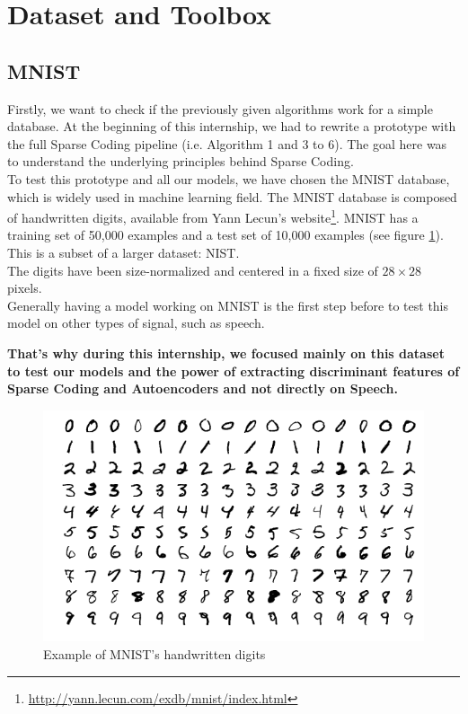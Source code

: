 \section{Dataset and Toolbox}
\subsection{MNIST}
Firstly, we want to check if the previously given algorithms work for a simple database. At the beginning of this internship, we had to rewrite a prototype with the full Sparse Coding pipeline (i.e. Algorithm 1 and 3 to 6). The goal here was to understand the underlying principles behind Sparse Coding.\\
To test this prototype and all our models, we have chosen the MNIST database, which is widely used in machine learning field. The MNIST database is composed of handwritten digits, available from Yann Lecun's website\footnote{\url{http://yann.lecun.com/exdb/mnist/index.html}}. MNIST has a training set of 50,000 examples and a test set of 10,000 examples (see figure \ref{fig:MNIST}). This is a subset of a larger dataset: NIST. \\
The digits have been size-normalized and centered in a fixed size of $28 \times 28$ pixels.\\
Generally having a model working on MNIST  is the first step before to test this model on other types of signal, such as speech.\\ 
\begin{mdframed}
\begin{center}
\textbf{That's why during this internship, we focused mainly on this dataset to test our models and the power of extracting discriminant features of Sparse Coding and Autoencoders and not directly on Speech.} 
\end{center}
\end{mdframed}

\begin{figure}[h]
 \centering
 \includegraphics[scale=0.4]{MnistExamples.png}
 \caption{Example of MNIST's handwritten digits}
  \label{fig:MNIST}
\end{figure}

